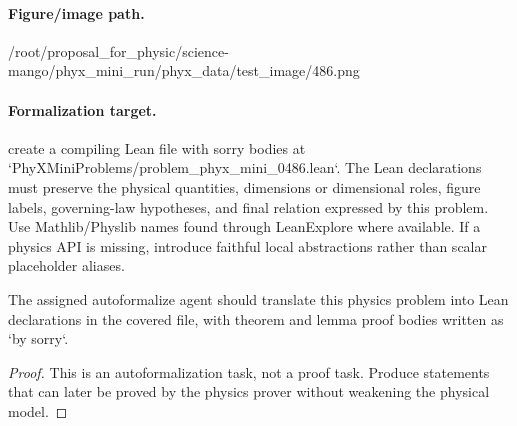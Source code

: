 \paragraph{Figure/image path.}
/root/proposal\_for\_physic/science-mango/phyx\_mini\_run/phyx\_data/test\_image/486.png

\paragraph{Formalization target.}
create a compiling Lean file with sorry bodies at `PhyXMiniProblems/problem\_phyx\_mini\_0486.lean`. The Lean declarations must preserve the physical quantities, dimensions or dimensional roles, figure labels, governing-law hypotheses, and final relation expressed by this problem.
Use Mathlib/Physlib names found through LeanExplore where available. If a physics API is missing, introduce faithful local abstractions rather than scalar placeholder aliases.

\begin{theorem}
\label{thm:physics:phyx_mini_0486:target}
The assigned autoformalize agent should translate this physics problem into Lean declarations in the covered file, with theorem and lemma proof bodies written as `by sorry`.
\end{theorem}
\begin{proof}
This is an autoformalization task, not a proof task. Produce statements that can later be proved by the physics prover without weakening the physical model.
\end{proof}

